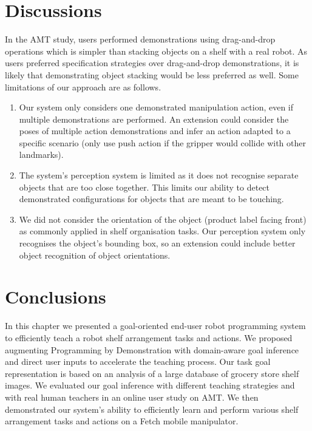 \section{Discussions}\label{sec:irosdiscussions}
In the AMT study, users performed demonstrations using drag-and-drop operations which is simpler than stacking objects on a shelf with a real robot. 
As users preferred specification strategies over drag-and-drop demonstrations, it is likely that demonstrating object stacking would be less preferred as well.
Some limitations of our approach are as follows.
\begin{enumerate}
	\item Our system only considers one demonstrated manipulation action, even if multiple demonstrations are performed. An extension could consider the poses of multiple action demonstrations and infer an action adapted to a specific scenario (\eg only use push action if the gripper would collide with other landmarks).
	\item The system's perception system is limited as it does not recognise separate objects that are too close together. This limits our ability to detect demonstrated configurations for objects that are meant to be touching.
	\item We did not consider the orientation of the object (\eg product label facing front) as commonly applied in shelf organisation tasks. Our perception system only recognises the object's bounding box, so an extension could include better object recognition of object orientations.
\end{enumerate}

\section{Conclusions}
\label{sec:irosconclusion}
In this chapter we presented a goal-oriented end-user robot programming system to efficiently teach a robot shelf arrangement tasks and actions.
We proposed augmenting Programming by Demonstration with domain-aware goal inference and direct user inputs to accelerate the teaching process.
Our task goal representation is based on an analysis of a large database of grocery store shelf images.
We evaluated our goal inference with different teaching strategies and with real human teachers in an online user study on AMT.
We then demonstrated our system's ability to efficiently learn and perform various shelf arrangement tasks and actions on a Fetch mobile manipulator.

